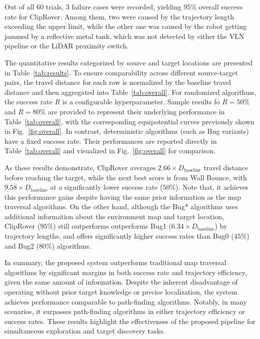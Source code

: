 Out of all $60$ trials, 3 failure cases were recorded, yielding $95\%$ overall success rate for ClipRover. Among them, two were caused by the trajectory length exceeding the upper limit, while the other one was caused by the robot getting jammed by a reflective metal tank, which was not detected by either the VLN pipeline or the LiDAR proximity switch.

The quantitative results categorized by source and target locations are presented in Table~\ref{tab:results}. To ensure comparability across different source-target pairs, the travel distance for each row is normalized by the baseline travel distance and then aggregated into Table~\ref{tab:overall}. For randomized algorithms, the success rate $R$ is a configurable hyperparameter. Sample results fo $R = 50\%$ and $R = 80\%$ are provided to represent their underlying performance in Table~\ref{tab:overall}, with the corresponding equipotential curves previously shown in Fig.~\ref{fig:overall}. In contrast, deterministic algorithms (such as Bug variants) have a fixed success rate. Their performances are reported directly in Table~\ref{tab:overall} and visualized in Fig.~\ref{fig:overall} for comparison.




As these results demonstrate, ClipRover averages $2.66 \times D_\text{baseline}$ travel distance before reaching the target, while the next best score is from Wall Bounce, with $9.58 \times D_\text{baseline}$ at a significantly lower success rate ($50\%$). Note that, it achieves this performance gains despite having the same prior information as the map traversal algorithms. On the other hand, although the Bug* algorithms uses additional information about the environment map and target location, ClipRover ($95\%$) still outperforms outperforms Bug1 ($6.34 \times D_\text{baseline}$) by trajectory lengths, and offers significantly higher success rates than Bug0 ($45\%$) and Bug2 ($80\%$) algorithms.


In summary, the proposed system outperforms traditional map traversal algorithms by significant margins in both success rate and trajectory efficiency, given the same amount of information. Despite the inherent disadvantage of operating without prior target knowledge or precise localization, the system achieves performance comparable to path-finding algorithms. Notably, in many scenarios, it surpasses path-finding algorithms in either trajectory efficiency or success rates. These results highlight the effectiveness of the proposed pipeline for simultaneous exploration and target discovery tasks.



